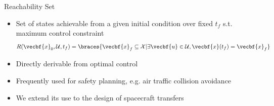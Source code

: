 \documentclass[11pt,professionalfonts]{beamer}
\begin{document}
\begin{frame}{Reachability Set}

\begin{itemize}
    \item Set of states achievable from a given initial condition over fixed \( t_f \) s.t. maximum control constraint
    \begin{align*}
        R( \vecbf{x}_0, \mathcal{U} , t_f) = \braces{ \vecbf{x}_f \subseteq \mathcal{X} | \exists \vecbf{u} \in \mathcal{U}, \vecbf{x}(t_f) = \vecbf{x}_f }
    \end{align*}
    \pause
    \item Directly derivable from optimal control
    \item Frequently used for safety planning, e.g. air traffic collision avoidance
    \pause
    \item We extend its use to the design of spacecraft transfers
\end{itemize}

\end{frame}
\end{document}

